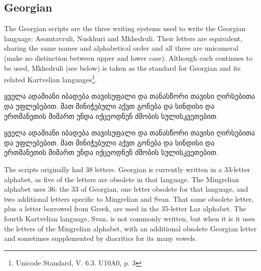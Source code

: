 \subsection{Georgian}

The Georgian scripts are the three writing systems used to write the Georgian language: Asomtavruli, Nuskhuri and Mkhedruli. Their letters are equivalent, sharing the same names and alphabetical order and all three are unicameral (make no distinction between upper and lower case). Although each continues to be used, Mkhedruli (see below) is taken as the standard for Georgian and its related Kartvelian languages\footnote{Unicode Standard, V. 6.3. U10A0, p. 3}. 

\bgroup
\topline

\newfontfamily{}

\newfontfamily{}

\begin{scriptexample}[]{}
\georgian 

\centering
 
ყველა ადამიანი იბადება თავისუფალი და თანასწორი თავისი ღირსებითა და უფლებებით. მათ მინიჭებული აქვთ გონება და სინდისი და ერთმანეთის მიმართ უნდა იქცეოდნენ ძმობის სულისკვეთებით.
\medskip

\georgianarial
ყველა ადამიანი იბადება თავისუფალი და თანასწორი თავისი ღირსებითა და უფლებებით. მათ მინიჭებული აქვთ გონება და სინდისი და ერთმანეთის მიმართ უნდა იქცეოდნენ ძმობის სულისკვეთებით.
\bottomline
{}

\end{scriptexample}

The scripts originally had 38 letters. Georgian is currently written in a 33-letter alphabet, as five of the letters are obsolete in that language. The Mingrelian alphabet uses 36: the 33 of Georgian, one letter obsolete for that language, and two additional letters specific to Mingrelian and Svan. That same obsolete letter, plus a letter borrowed from Greek, are used in the 35-letter Laz alphabet. The fourth Kartvelian language, Svan, is not commonly written, but when it is it uses the letters of the Mingrelian alphabet, with an additional obsolete Georgian letter and sometimes supplemented by diacritics for its many vowels.